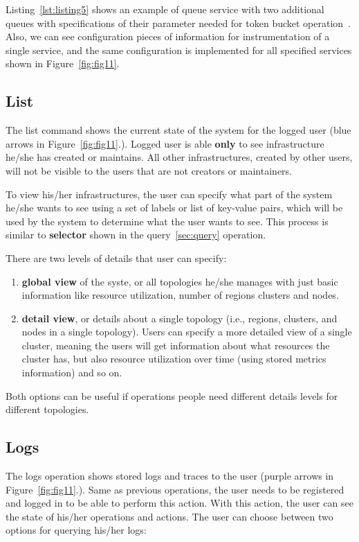 Listing~\ref{lst:listing5} shows an example of queue service with two additional queues with specifications of their parameter needed for token bucket operation~\cite{MathewsKG17}. Also, we can see configuration pieces of information for instrumentation of a single service, and the same configuration is implemented for all specified services shown in Figure~\ref{fig:fig11}.


%
%
\subsection{List}\label{sec:list} 
% 
The list command shows the current state of the system for the logged user (blue arrows in Figure~\ref{fig:fig11}.). Logged user is able \textbf{only} to see infrastructure he/she has created or maintains. All other infrastructures, created by other users, will not be visible to the users that are not creators or maintainers.

To view his/her infrastructures, the user can specify what part of the system he/she wants to see using a set of labels or list of key-value pairs, which will be used by the system to determine what the user wants to see. This process is similar to \textbf{selector} shown in the query~\ref{sec:query} operation. 

There are two levels of details that user can specify:

\begin{enumerate}[start=1,label={(\bfseries \arabic*)}]
	\item \textbf{global view}  of the syste, or all topologies he/she manages with just basic information like resource utilization, number of regions clusters and nodes.
	\item \textbf{detail view}, or details about a single topology (i.e., regions, clusters, and nodes in a single topology). Users can specify a more detailed view of a single cluster, meaning the users will get information about what resources the cluster has, but also resource utilization over time (using stored metrics information) and so on.
\end{enumerate}

\noindent
Both options can be useful if operations people need different details levels for different topologies. 
%
%
\subsection{Logs}\label{sec:logs}
% 
The logs operation shows stored logs and traces to the user (purple arrows in Figure~\ref{fig:fig11}.). Same as previous operations, the user needs to be registered and logged in to be able to perform this action. With this action, the user can see the state of his/her operations and actions. The user can choose between two options for querying his/her logs:

